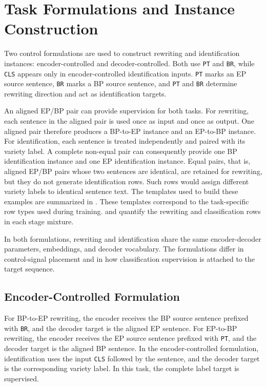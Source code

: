 \section{Task Formulations and Instance Construction}
\label{sec:method-task-formulations}

Two control formulations are used to construct rewriting and identification
instances: encoder-controlled and decoder-controlled. Both use \texttt{PT} and
\texttt{BR}, while \texttt{CLS} appears only in encoder-controlled
identification inputs. \texttt{PT} marks an EP source sentence, \texttt{BR}
marks a BP source sentence, and \texttt{PT} and \texttt{BR} determine rewriting
direction and act as identification targets.

An aligned EP/BP pair can provide supervision for both tasks. For rewriting,
each sentence in the aligned pair is used once as input and once as output. One aligned pair therefore
produces a BP-to-EP instance and an EP-to-BP instance. For identification, each
sentence is treated independently and paired with its variety label. A
complete non-equal pair can consequently provide one BP identification
instance and one EP identification instance. Equal pairs, that is, aligned
EP/BP pairs whose two sentences are identical, are retained for rewriting,
but they do not generate identification rows. Such rows would assign different
variety labels to identical sentence text.
The templates used to build
these examples are summarized in .
These templates correspond to the task-specific row types used during training.
 and  quantify the rewriting
and classification rows in each stage mixture.

In both formulations, rewriting and identification share the same
encoder-decoder parameters, embeddings, and decoder vocabulary. The
formulations differ in control-signal placement and in how classification
supervision is attached to the target sequence.

\subsection{Encoder-Controlled Formulation}
\label{sec:method-encoder-control}

For BP-to-EP rewriting, the encoder receives the BP source sentence prefixed
with \texttt{BR}, and the decoder target is the aligned EP sentence. For
EP-to-BP rewriting, the encoder receives the EP source sentence prefixed with
\texttt{PT}, and the decoder target is the aligned BP sentence. In the
encoder-controlled formulation, identification uses the input \texttt{CLS} followed
by the sentence, and the decoder target is the corresponding variety
label. In this task, the complete label target is supervised.

